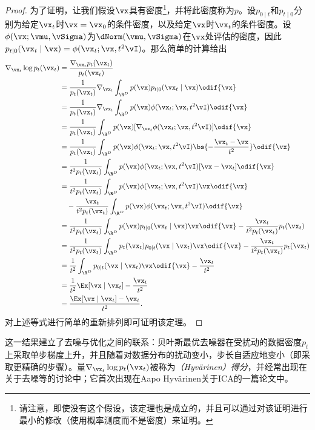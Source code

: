 \documentclass[../../book-main_zh.tex]{subfiles}
\begin{document}
\begin{proof}
    为了证明，让我们假设\(\vx\)具有密度\footnote{请注意，即使没有这个假设，该定理也是成立的，并且可以通过对该证明进行最小的修改（使用概率测度而不是密度）来证明。}，并将此密度称为\(p\)。设\(p_{0 \mid t}\)和\(p_{t \mid 0}\)分别为给定\(\vx_{t}\)时\(\vx = \vx_{0}\)的条件密度，以及给定\(\vx\)时\(\vx_{t}\)的条件密度。设\(\phi(\vx ; \vmu, \vSigma)\)为\(\dNorm(\vmu, \vSigma)\)在\(\vx\)处评估的密度，因此\(p_{t \mid 0}(\vx_{t} \mid \vx) = \phi(\vx_{t} ; \vx, t^{2}\vI)\)。那么简单的计算给出
    \begin{align}
        \nabla_{\vx_{t}} \log p_{t}(\vx_{t})
        &= \frac{\nabla_{\vx_{t}}p_{t}(\vx_{t})}{p_{t}(\vx_{t})} \\
        &=
        \frac{1}{p_{t}(\vx_{t})}\nabla_{\vx_{t}}\int_{\R^{D}}p(\vx)p_{t
        \mid 0}(\vx_{t} \mid \vx)\odif{\vx} \\
        &=
        \frac{1}{p_{t}(\vx_{t})}\nabla_{\vx_{t}}\int_{\R^{D}}p(\vx)\phi(\vx_{t}
        ;\vx, t^{2}\vI)\odif{\vx} \\
        &=
        \frac{1}{p_{t}(\vx_{t})}\int_{\R^{D}}p(\vx)[\nabla_{\vx_{t}}\phi(\vx_{t}
        ;\vx, t^{2}\vI)]\odif{\vx} \\
        &= \frac{1}{p_{t}(\vx_{t})}\int_{\R^{D}}p(\vx)\phi(\vx_{t} ;
        \vx, t^{2}\vI)\bs{-\frac{\vx_{t} - \vx}{t^{2}}}\odif{\vx} \\
        &=
        \frac{1}{t^{2}p_{t}(\vx_{t})}\int_{\R^{D}}p(\vx)\phi(\vx_{t}
        ; \vx, t^{2}\vI)[\vx - \vx_{t}]\odif{\vx} \\
        &= \frac{1}{t^{2}p_{t}(\vx_{t})}\int_{\R^{D}}p(\vx)\phi(\vx_{t} ; \vx,
        t^{2}\vI)\vx \odif{\vx} \\
        & \quad -
        \frac{\vx_{t}}{t^{2}p_{t}(\vx_{t})}\int_{\R^{D}}p(\vx)\phi(\vx_{t}
        ; \vx, t^{2}\vI)\odif{\vx}\nonumber \\
        &= \frac{1}{t^{2}p_{t}(\vx_{t})}\int_{\R^{D}}p(\vx)p_{t \mid
        0}(\vx_{t} \mid \vx)\vx \odif{\vx} -
        \frac{\vx_{t}}{t^{2}p_{t}(\vx_{t})}p_{t}(\vx_{t}) \\
        &=
        \frac{1}{t^{2}p_{t}(\vx_{t})}\int_{\R^{D}}p_{t}(\vx_{t})p_{0
        \mid t}(\vx \mid \vx_{t})\vx \odif{\vx} -
        \frac{\vx_{t}}{t^{2}p_{t}(\vx_{t})}p_{t}(\vx_{t}) \\
        &= \frac{1}{t^{2}}\int_{\R^{D}}p_{0 \mid t}(\vx \mid
        \vx_{t})\vx \odif{\vx} - \frac{\vx_{t}}{t^{2}} \\
        &= \frac{1}{t^{2}}\Ex[\vx \mid \vx_{t}] - \frac{\vx_{t}}{t^{2}} \\
        &= \frac{\Ex[\vx \mid \vx_{t}] - \vx_{t}}{t^{2}}.
    \end{align}
    对上述等式进行简单的重新排列即可证明该定理。
\end{proof}
这一结果建立了去噪与优化之间的联系：贝叶斯最优去噪器在受扰动的数据密度\(p_{t}\)上采取单步梯度上升，并且随着对数据分布的扰动变小，步长自适应地变小（即采取更精确的步骤）。量\(\nabla_{\vx_{t}}\log p_{t}(\vx_{t})\)被称为\textit{（Hyv\"arinen）得分}，并经常出现在关于去噪等的讨论中；它首次出现在Aapo Hyv\"arinen关于ICA的一篇论文中\cite{hyvarinen05a}。
\end{document}
